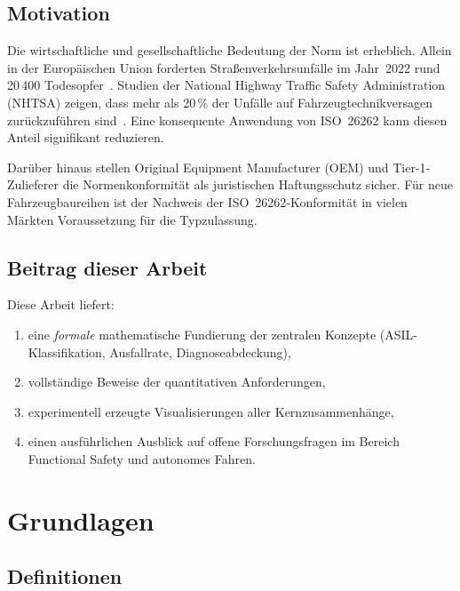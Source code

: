 ﻿\documentclass[a4paper,12pt]{article}
\theoremstyle{definition}
\begin{document}
\subsection{Motivation}

Die wirtschaftliche und gesellschaftliche Bedeutung der Norm ist erheblich.
Allein in der Europäischen Union forderten Straßenverkehrsunfälle im
Jahr~2022 rund 20\,400 Todesopfer~\cite{eu_road_safety_2023}. Studien der
National Highway Traffic Safety Administration (NHTSA) zeigen, dass mehr
als 20\,\% der Unfälle auf Fahrzeugtechnikversagen zurückzuführen
sind~\cite{nhtsa_2022}. Eine konsequente Anwendung von ISO~26262 kann
diesen Anteil signifikant reduzieren.

Darüber hinaus stellen Original Equipment Manufacturer (OEM) und
Tier-1-Zulieferer die Normenkonformität als juristischen Haftungsschutz
sicher. Für neue Fahrzeugbaureihen ist der Nachweis der
ISO~26262-Konformität in vielen Märkten Voraussetzung für die Typzulassung.

\subsection{Beitrag dieser Arbeit}

Diese Arbeit liefert:
\begin{enumerate}
  \item eine \emph{formale} mathematische Fundierung der zentralen Konzepte
        (ASIL-Klassifikation, Ausfallrate, Diagnoseabdeckung),
  \item vollständige Beweise der quantitativen Anforderungen,
  \item experimentell erzeugte Visualisierungen aller Kernzusammenhänge,
  \item einen ausführlichen Ausblick auf offene Forschungsfragen im Bereich
        Functional Safety und autonomes Fahren.
\end{enumerate}

\section{Grundlagen}

\subsection{Definitionen}
\end{document}
